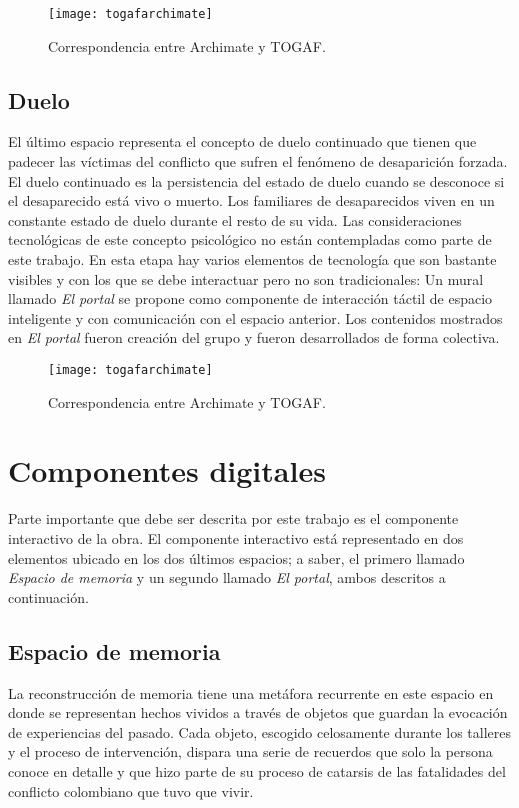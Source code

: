 \begin{figure}[h]\label{togafarchimate}
\centering
\texttt{[image: togafarchimate]}
\caption{Correspondencia entre Archimate y TOGAF.}
\end{figure}


\subsection{Duelo}

El último espacio representa el concepto de duelo continuado que tienen que padecer las víctimas del conflicto que sufren el fenómeno de desaparición forzada. El duelo continuado es la persistencia del estado de duelo cuando se desconoce si el desaparecido está vivo o muerto. Los familiares de desaparecidos viven en un constante estado de duelo durante el resto de su vida. Las consideraciones tecnológicas de este concepto psicológico no están contempladas como parte de este trabajo. En esta etapa hay varios elementos de tecnología que son bastante visibles y con los que se debe interactuar pero no son tradicionales: Un mural llamado \textit{El portal} se propone como componente de interacción táctil de espacio inteligente y con comunicación con el espacio anterior. Los contenidos mostrados en \textit{El portal} fueron creación del grupo y fueron desarrollados de forma colectiva.

\begin{figure}[h]\label{togafarchimate}
\centering
\texttt{[image: togafarchimate]}
\caption{Correspondencia entre Archimate y TOGAF.}
\end{figure}

\section{Componentes digitales}

Parte importante que debe ser descrita por este trabajo es el componente interactivo de la obra. El componente interactivo está representado en dos elementos ubicado en los dos últimos espacios; a saber, el primero llamado \textit{Espacio de memoria} y un segundo llamado \textit{El portal}, ambos descritos a continuación.

\subsection{Espacio de memoria}

La reconstrucción de memoria tiene una metáfora recurrente en este espacio en donde se representan hechos vividos a través de objetos que guardan la evocación de experiencias del pasado. Cada objeto, escogido celosamente durante los talleres y el proceso de intervención, dispara una serie de recuerdos que solo la persona conoce en detalle y que hizo parte de su proceso de catarsis de las fatalidades del conflicto colombiano que tuvo que vivir.

